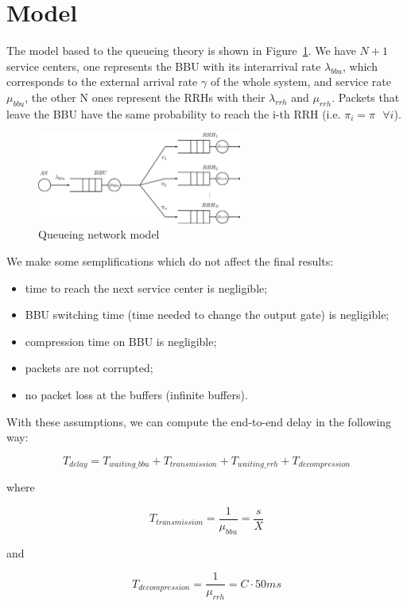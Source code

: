 \documentclass[11pt,a4paper,oneside, openright]{article}
\begin{document}
\section{Model}
The model based to the queueing theory is shown in Figure~\ref{fig:model}.
We have $ N + 1 $ service centers, one represents the BBU with its interarrival rate $ \lambda_{bbu} $, which corresponds to the external arrival rate $ \gamma $ of the whole system, and service rate $ \mu_{bbu} $, the other N ones represent the RRHs with their $ \lambda_{rrh} $ and $ \mu_{rrh} $. Packets that leave the BBU have the same probability to reach the i-th RRH (i.e. $ \pi_{i} = \pi \text{ } \forall i $).
\begin{figure}[h]
	\centering
	\includegraphics[width=0.6\textwidth]{images/model}
	\caption{Queueing network model}
	\label{fig:model}
\end{figure}

We make some semplifications which do not affect the final results:
\begin{itemize}
    \item time to reach the next service center is negligible;
    \item BBU switching time (time needed to change the output gate) is negligible;
    \item compression time on BBU is negligible;
    \item packets are not corrupted;
    \item no packet loss at the buffers (infinite buffers).
\end{itemize}

With these assumptions, we can compute the end-to-end delay in the following way:


$$ T_{delay} =  T_{waiting\_bbu} + T_{transmission} + T_{waiting\_rrh} + T_{decompression} $$

where 

$$ T_{transmission} = \frac{1}{\mu_{bbu}} = \frac{s}{X} $$

and

$$ T_{decompression} = \frac{1}{\mu_{rrh}} = C \cdot 50ms $$
\end{document}
